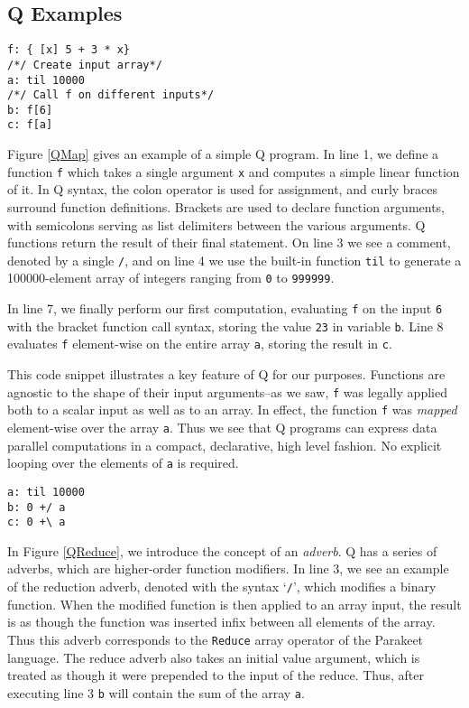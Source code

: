 \documentclass[preprint]{sigplanconf}
\begin{document}
\subsection{Q Examples}

\begin{lstlisting}[caption=Q Map Example]
f: { [x] 5 + 3 * x}
/*/ Create input array*/
a: til 10000
/*/ Call f on different inputs*/
b: f[6]
c: f[a]
\end{lstlisting}
\label{QMap}

Figure \ref{QMap} gives an example of a simple Q program.  In line 1, we define
a function \texttt{f} which takes a single argument \texttt{x} and computes a
simple linear function of it.  In Q syntax, the colon operator is used for
assignment, and curly braces surround function definitions.  Brackets are used
to declare function arguments, with semicolons serving as list delimiters
between the various arguments.  Q functions return the result of their final
statement.  On line 3 we see a comment, denoted by a single \texttt{/}, and on
line 4 we use the built-in function \texttt{til} to generate a
100000-element array of integers ranging from \texttt{0} to \texttt{999999}.

In line 7, we finally perform our first computation, evaluating \texttt{f} on
the input \texttt{6} with the bracket function call syntax, storing the
value \texttt{23} in variable \texttt{b}.  Line 8 evaluates \texttt{f}
element-wise on the entire array \texttt{a}, storing the result in \texttt{c}.

This code snippet illustrates a key feature of Q for our purposes.  Functions
are agnostic to the shape of their input arguments--as we saw, \texttt{f} was
legally applied both to a scalar input as well as to an array.  In effect, the
function \texttt{f} was {\it mapped} element-wise over the array \texttt{a}.
Thus we see that Q programs can express data parallel computations in a compact,
declarative, high level fashion.  No explicit looping over the elements of
\texttt{a} is required.

\begin{lstlisting}[caption=Q Reductions Example]
a: til 10000
b: 0 +/ a
c: 0 +\ a
\end{lstlisting}
\label{QReduce}


In Figure \ref{QReduce}, we introduce the concept of an \emph{adverb}.  Q has a
series of adverbs, which are higher-order function modifiers.  In
line 3, we see an example of the reduction adverb, denoted with the syntax
`\texttt{/}', which modifies a binary function. When the modified function is
then applied to an array input, the result is as though the function was
inserted infix between all elements of the array.  Thus this adverb corresponds
to the \texttt{Reduce} array operator of the Parakeet language.  The reduce
adverb also takes an initial value argument, which is treated as though it were
prepended to the input of the reduce.  Thus, after executing line 3 \texttt{b}
will contain the sum of the array \texttt{a}.
\end{document}
